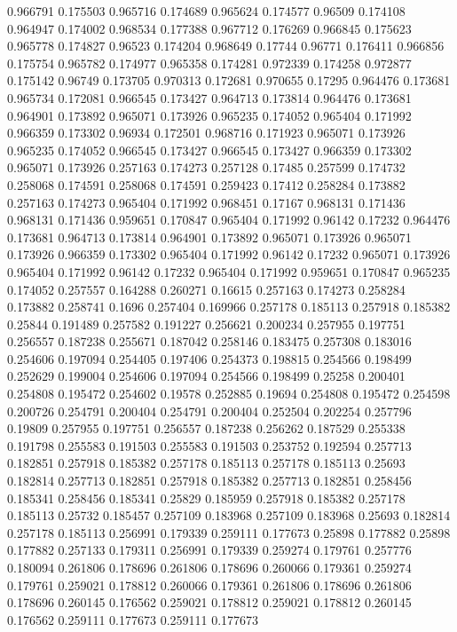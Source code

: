 0.966791 0.175503
0.965716 0.174689
0.965624 0.174577
0.96509 0.174108
0.964947 0.174002
0.968534 0.177388
0.967712 0.176269
0.966845 0.175623
0.965778 0.174827
0.96523 0.174204
0.968649 0.17744
0.96771 0.176411
0.966856 0.175754
0.965782 0.174977
0.965358 0.174281
0.972339 0.174258
0.972877 0.175142
0.96749 0.173705
0.970313 0.172681
0.970655 0.17295
0.964476 0.173681
0.965734 0.172081
0.966545 0.173427
0.964713 0.173814
0.964476 0.173681
0.964901 0.173892
0.965071 0.173926
0.965235 0.174052
0.965404 0.171992
0.966359 0.173302
0.96934 0.172501
0.968716 0.171923
0.965071 0.173926
0.965235 0.174052
0.966545 0.173427
0.966545 0.173427
0.966359 0.173302
0.965071 0.173926
0.257163 0.174273
0.257128 0.17485
0.257599 0.174732
0.258068 0.174591
0.258068 0.174591
0.259423 0.17412
0.258284 0.173882
0.257163 0.174273
0.965404 0.171992
0.968451 0.17167
0.968131 0.171436
0.968131 0.171436
0.959651 0.170847
0.965404 0.171992
0.96142 0.17232
0.964476 0.173681
0.964713 0.173814
0.964901 0.173892
0.965071 0.173926
0.965071 0.173926
0.966359 0.173302
0.965404 0.171992
0.96142 0.17232
0.965071 0.173926
0.965404 0.171992
0.96142 0.17232
0.965404 0.171992
0.959651 0.170847
0.965235 0.174052
0.257557 0.164288
0.260271 0.16615
0.257163 0.174273
0.258284 0.173882
0.258741 0.1696
0.257404 0.169966
0.257178 0.185113
0.257918 0.185382
0.25844 0.191489
0.257582 0.191227
0.256621 0.200234
0.257955 0.197751
0.256557 0.187238
0.255671 0.187042
0.258146 0.183475
0.257308 0.183016
0.254606 0.197094
0.254405 0.197406
0.254373 0.198815
0.254566 0.198499
0.252629 0.199004
0.254606 0.197094
0.254566 0.198499
0.25258 0.200401
0.254808 0.195472
0.254602 0.19578
0.252885 0.19694
0.254808 0.195472
0.254598 0.200726
0.254791 0.200404
0.254791 0.200404
0.252504 0.202254
0.257796 0.19809
0.257955 0.197751
0.256557 0.187238
0.256262 0.187529
0.255338 0.191798
0.255583 0.191503
0.255583 0.191503
0.253752 0.192594
0.257713 0.182851
0.257918 0.185382
0.257178 0.185113
0.257178 0.185113
0.25693 0.182814
0.257713 0.182851
0.257918 0.185382
0.257713 0.182851
0.258456 0.185341
0.258456 0.185341
0.25829 0.185959
0.257918 0.185382
0.257178 0.185113
0.25732 0.185457
0.257109 0.183968
0.257109 0.183968
0.25693 0.182814
0.257178 0.185113
0.256991 0.179339
0.259111 0.177673
0.25898 0.177882
0.25898 0.177882
0.257133 0.179311
0.256991 0.179339
0.259274 0.179761
0.257776 0.180094
0.261806 0.178696
0.261806 0.178696
0.260066 0.179361
0.259274 0.179761
0.259021 0.178812
0.260066 0.179361
0.261806 0.178696
0.261806 0.178696
0.260145 0.176562
0.259021 0.178812
0.259021 0.178812
0.260145 0.176562
0.259111 0.177673
0.259111 0.177673
